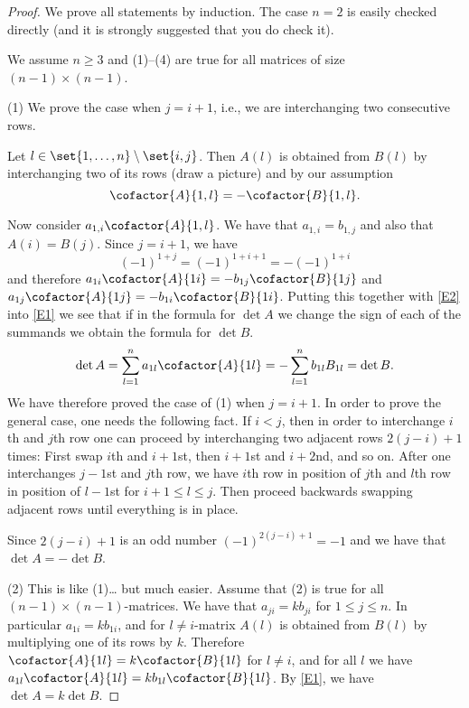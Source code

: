 \begin{proof}
  We prove all statements by induction. The case $n=2$ is easily
  checked directly (and it is strongly suggested that you do check
  it).

  We assume $n\geq 3$ and (1)--(4) are true for all matrices of size
  $(n-1)\times (n-1)$.

  (1) We prove the case when $j=i+1$, i.e., we are interchanging two
  consecutive rows.

  Let $l\in \set{1, \dots, n}\setminus \set{i,j}$.  Then $A(l)$ is
  obtained from $B(l)$ by interchanging two of its rows (draw a
  picture) and by our assumption
  \begin{equation}
    \label{E2}
    \cofactor{A}{1,l}=-\cofactor{B}{1,l}.
  \end{equation}

  Now consider $a_{1,i} \cofactor{A}{1,l}$. We have that $a_{1,i}=b_{1,j}$
  and also that $A(i)=B(j)$. Since $j=i+1$, we have
  \begin{equation*}
    (-1)^{1+j}=(-1)^{1+i+1}=-(-1)^{1+i}
  \end{equation*}
  and therefore $a_{1i}\cofactor{A}{1i}=-b_{1j} \cofactor{B}{1j}$ and
  $a_{1j}\cofactor{A}{1j}=-b_{1i} \cofactor{B}{1i}$.  Putting this together with
  \eqref{E2} into \eqref{E1} we see that if in the formula for
  $\det A$ we change the sign of each of the summands we obtain the
  formula for $\det B$.
  \begin{equation*}
    \det A=\sum_{l=1}^n a_{1l}\cofactor{A}{1l}
    =-\sum_{l=1}^n b_{1l} B_{1l}
    =\det B.
  \end{equation*}
  We have therefore proved the case of (1) when $j=i+1$. In order to
  prove the general case, one needs the following fact. If $i<j$, then
  in order to interchange $i$th and $j$th row one can proceed by
  interchanging two adjacent rows $2(j-i)+1$ times: First swap $i$th
  and $i+1$st, then $i+1$st and $i+2$nd, and so on.  After one
  interchanges $j-1$st and $j$th row, we have $i$th row in position of
  $j$th and $l$th row in position of $l-1$st for $i+1\leq l\leq
  j$. Then proceed backwards swapping adjacent rows until everything
  is in place.

  Since $2(j-i)+1$ is an odd number $(-1)^{2(j-i)+1}=-1$ and we have
  that $\det A=-\det B$.

  (2) This is like (1)\dots{} but much easier.  Assume that (2) is
  true for all $(n-1)\times (n-1)$-matrices.  We have that
  $a_{ji}=k b_{ji}$ for $1\leq j\leq n$.  In particular
  $a_{1i}=kb_{1i}$, and for $l\neq i$-matrix $A(l)$ is obtained from
  $B(l)$ by multiplying one of its rows by $k$.  Therefore
  $\cofactor{A}{1l}=k\cofactor{B}{1l}$ for $l\neq i$, and for all $l$ we have
  $a_{1l} \cofactor{A}{1l}=k b_{1l}\cofactor{B}{1l}$.  By \eqref{E1}, we have
  $\det A=k\det B$.


\end{proof}
